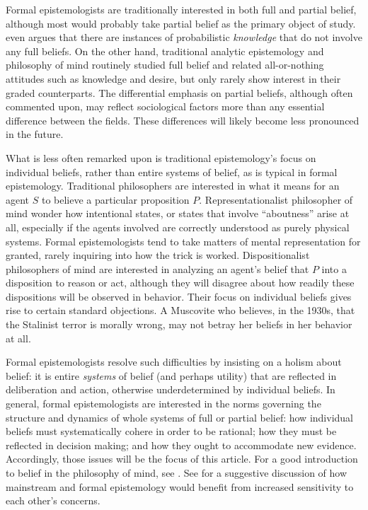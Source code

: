 Formal epistemologists are traditionally interested in both full and partial
belief, although most would probably take partial belief as the primary object
of study. \citet{moss2018probabilistic} even argues that there are instances of
probabilistic {\em knowledge} that do not involve any full beliefs.  On the
other hand, traditional analytic epistemology and philosophy of mind routinely
studied full belief and related all-or-nothing attitudes such as knowledge and
desire, but only rarely show interest in their graded counterparts. The
differential emphasis on partial beliefs, although often commented upon, may
reflect sociological factors more than any essential difference between the
fields. These differences will likely become less pronounced in the future.

What is less often remarked upon is traditional epistemology's focus on
individual beliefs, rather than entire systems of belief, as is typical in
formal epistemology. Traditional philosophers are interested in what it means
for an agent $S$ to believe a particular proposition $P$. Representationalist
philosopher of mind wonder how intentional states, or states that involve
``aboutness'' arise at all, especially if the agents involved are correctly
understood as purely physical systems. Formal epistemologists tend to take
matters of mental representation for granted, rarely inquiring into how the
trick is worked.  Dispositionalist philosophers of mind are interested in
analyzing an agent's belief that $P$ into a disposition to reason or act,
although they will disagree about how readily these dispositions will be
observed in behavior. Their focus on individual beliefs gives rise to certain
standard objections. A Muscovite who believes, in the 1930s, that the Stalinist
terror is morally wrong, may not betray her beliefs in her behavior at all.

Formal epistemologists resolve such difficulties by insisting on a holism about
belief: it is entire {\em systems} of belief (and perhaps utility) that are
reflected in deliberation and action, otherwise underdetermined by individual
beliefs. In general, formal epistemologists are interested in the norms
governing the structure and dynamics of whole systems of full or partial belief:
how individual beliefs must systematically cohere in order to be rational; how
they must be reflected in decision making; and how they ought to accommodate new
evidence. Accordingly, those issues will be the focus of this article. For a
good introduction to belief in the philosophy of mind, see \citet{sep-belief}.
See \citet{hajek2017tale} for a suggestive discussion of how mainstream and
formal epistemology would benefit from increased sensitivity to each other's
concerns.

